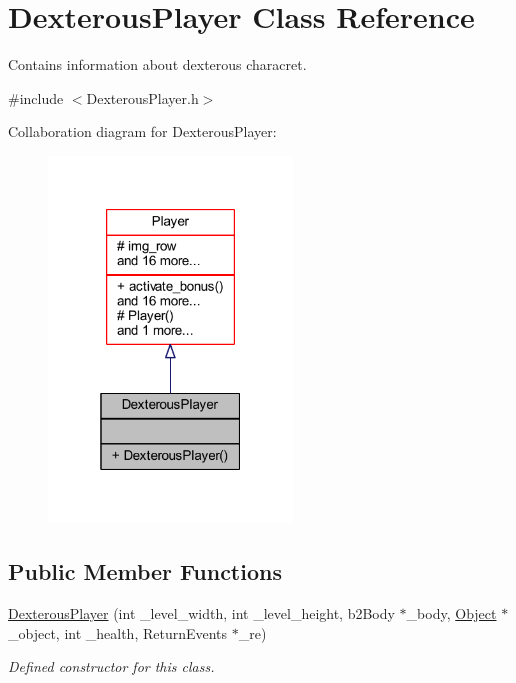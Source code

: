 \hypertarget{class_dexterous_player}{}\section{Dexterous\+Player Class Reference}
\label{class_dexterous_player}


Contains information about dexterous characret.  




{\ttfamily \#include $<$Dexterous\+Player.\+h$>$}



Collaboration diagram for Dexterous\+Player\+:\nopagebreak
\begin{figure}[H]
\begin{center}
\leavevmode
\includegraphics[width=184pt]{class_dexterous_player__coll__graph}
\end{center}
\end{figure}
\subsection*{Public Member Functions}
\begin{DoxyCompactItemize}
\item 
\hyperlink{class_dexterous_player_a852e50ce93cf01a9b042e58a6bcf2e4e}{Dexterous\+Player} (int \+\_\+level\+\_\+width, int \+\_\+level\+\_\+height, b2\+Body $\ast$\+\_\+body, \hyperlink{class_object}{Object} $\ast$\+\_\+object, int \+\_\+health, Return\+Events $\ast$\+\_\+re)
\begin{DoxyCompactList}\small\item\em Defined constructor for this class. \end{DoxyCompactList}\end{DoxyCompactItemize}
